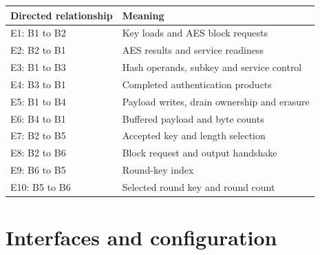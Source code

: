 \documentclass[11pt,a4paper]{article}
\begin{document}
{\small\renewcommand{\arraystretch}{1.18}\begin{longtable}{@{}L{0.24\textwidth}|L{0.7\textwidth}@{}}\toprule

\textbf{Directed relationship} & \textbf{Meaning}\\\midrule\endhead

E1: B1 to B2 & Key loads and AES block requests\\[2pt]\hline

E2: B2 to B1 & AES results and service readiness\\[2pt]\hline

E3: B1 to B3 & Hash operands,\allowbreak{} subkey and service control\\[2pt]\hline

E4: B3 to B1 & Completed authentication products\\[2pt]\hline

E5: B1 to B4 & Payload writes,\allowbreak{} drain ownership and erasure\\[2pt]\hline

E6: B4 to B1 & Buffered payload and byte counts\\[2pt]\hline

E7: B2 to B5 & Accepted key and length selection\\[2pt]\hline

E8: B2 to B6 & Block request and output handshake\\[2pt]\hline

E9: B6 to B5 & Round-key index\\[2pt]\hline

E10: B5 to B6 & Selected round key and round count\\[2pt]\hline

\bottomrule\end{longtable}}

\section{Interfaces and configuration}
\end{document}
